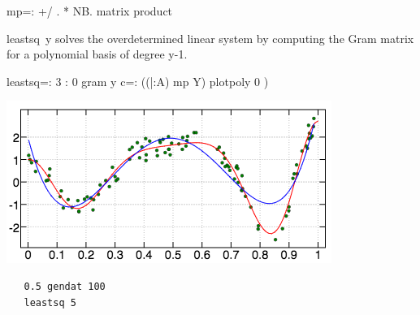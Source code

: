 \documentclass[10pt]{article}%
\begin{document}
\nwendcode{}\plusendmoddef\nwstartdeflinemarkup{}\nwenddeflinemarkup
mp=: +/ . * NB. matrix product

\nwendcode{}\nwdocspar

{\Tt{}leastsq\ y\nwendquote} solves the overdetermined linear system by computing the Gram
matrix for a polynomial basis of degree {\Tt{}y-1\nwendquote}.

\nwenddocs{}\plusendmoddef\nwstartdeflinemarkup{}\nwenddeflinemarkup
leastsq=: 3 : 0
  gram y
  c=: ((|:A) mp Y) %
  plotpoly 0
)

\nwendcode{}\nwdocspar
\noindent\begin{minipage}{0.5\textwidth}
\includegraphics[width=\linewidth]{leastsq5}
\end{minipage}%
\hfill%
\begin{minipage}{0.4\textwidth}
\begin{verbatim}
   0.5 gendat 100
   leastsq 5
\end{verbatim}
\end{minipage}
\end{document}
